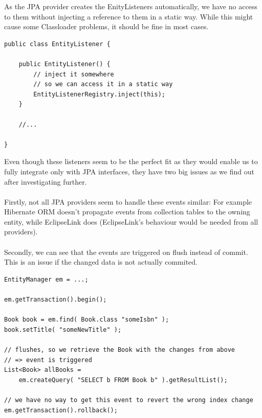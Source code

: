 \noindent
As the JPA provider creates the EnityListeners automatically, we have no access to them without injecting a reference to them in a static way. While this might cause some Classloader problems, it should be fine in most cases.
\\
\lstset{language=java}
\begin{lstlisting}[frame=htrbl, caption={Injecting the EntityListener}, label={lst:jpa_entity_listener.java}]
public class EntityListener {

	public EntityListener() {
		// inject it somewhere
		// so we can access it in a static way
		EntityListenerRegistry.inject(this);
	}

	//...

}
\end{lstlisting}

\noindent
Even though these listeners seem to be the perfect fit as they would enable us to fully integrate only with JPA interfaces, they have two big issues as we find out after investigating further.
\\\\
Firstly, not all JPA providers seem to handle these events similar: For example Hibernate ORM doesn't propagate events from collection tables to the owning entity, while EclipseLink does (EclipseLink's behaviour would be needed from all providers).
\\\\
Secondly, we can see that the events are triggered on flush instead of commit. This is an issue if the changed data is not actually commited.
\\

\lstset{language=java}
\begin{lstlisting}[frame=htrbl, caption={Event triggering on flush}, label={lst:flush_event.java}]
EntityManager em = ...;

em.getTransaction().begin();

Book book = em.find( Book.class "someIsbn" );
book.setTitle( "someNewTitle" );

// flushes, so we retrieve the Book with the changes from above
// => event is triggered
List<Book> allBooks = 
	em.createQuery( "SELECT b FROM Book b" ).getResultList();

// we have no way to get this event to revert the wrong index change
em.getTransaction().rollback();
\end{lstlisting}

